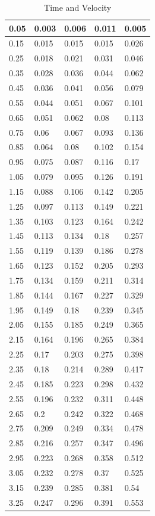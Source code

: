 \documentclass{article}
\begin{document}
 	\begin{table}[!ht]
 		\centering
 		\begin{tabular}{|l|l|l|l|l|}
 			\hline
 			0.05 & 0.003 & 0.006 & 0.011 & 0.005 \\ \hline
 			0.15 & 0.015 & 0.015 & 0.015 & 0.026 \\ \hline
 			0.25 & 0.018 & 0.021 & 0.031 & 0.046 \\ \hline
 			0.35 & 0.028 & 0.036 & 0.044 & 0.062 \\ \hline
 			0.45 & 0.036 & 0.041 & 0.056 & 0.079 \\ \hline
 			0.55 & 0.044 & 0.051 & 0.067 & 0.101 \\ \hline
 			0.65 & 0.051 & 0.062 & 0.08 & 0.113 \\ \hline
 			0.75 & 0.06 & 0.067 & 0.093 & 0.136 \\ \hline
 			0.85 & 0.064 & 0.08 & 0.102 & 0.154 \\ \hline
 			0.95 & 0.075 & 0.087 & 0.116 & 0.17 \\ \hline
 			1.05 & 0.079 & 0.095 & 0.126 & 0.191 \\ \hline
 			1.15 & 0.088 & 0.106 & 0.142 & 0.205 \\ \hline
 			1.25 & 0.097 & 0.113 & 0.149 & 0.221 \\ \hline
 			1.35 & 0.103 & 0.123 & 0.164 & 0.242 \\ \hline
 			1.45 & 0.113 & 0.134 & 0.18 & 0.257 \\ \hline
 			1.55 & 0.119 & 0.139 & 0.186 & 0.278 \\ \hline
 			1.65 & 0.123 & 0.152 & 0.205 & 0.293 \\ \hline
 			1.75 & 0.134 & 0.159 & 0.211 & 0.314 \\ \hline
 			1.85 & 0.144 & 0.167 & 0.227 & 0.329 \\ \hline
 			1.95 & 0.149 & 0.18 & 0.239 & 0.345 \\ \hline
 			2.05 & 0.155 & 0.185 & 0.249 & 0.365 \\ \hline
 			2.15 & 0.164 & 0.196 & 0.265 & 0.384 \\ \hline
 			2.25 & 0.17 & 0.203 & 0.275 & 0.398 \\ \hline
 			2.35 & 0.18 & 0.214 & 0.289 & 0.417 \\ \hline
 			2.45 & 0.185 & 0.223 & 0.298 & 0.432 \\ \hline
 			2.55 & 0.196 & 0.232 & 0.311 & 0.448 \\ \hline
 			2.65 & 0.2 & 0.242 & 0.322 & 0.468 \\ \hline
 			2.75 & 0.209 & 0.249 & 0.334 & 0.478 \\ \hline
 			2.85 & 0.216 & 0.257 & 0.347 & 0.496 \\ \hline
 			2.95 & 0.223 & 0.268 & 0.358 & 0.512 \\ \hline
 			3.05 & 0.232 & 0.278 & 0.37 & 0.525 \\ \hline
 			3.15 & 0.239 & 0.285 & 0.381 & 0.54 \\ \hline
 			3.25 & 0.247 & 0.296 & 0.391 & 0.553 \\ \hline
 		\end{tabular}
 		\caption{Time and Velocity}
 		\label{vel1}
 	\end{table}
 
\end{document}
